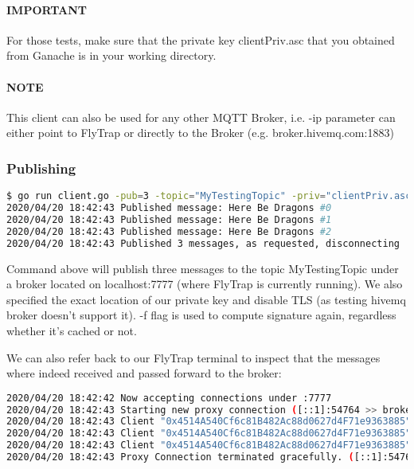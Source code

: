 \paragraph{IMPORTANT} For those tests, make sure that the private key clientPriv.asc that you obtained from Ganache is in your working directory.
\paragraph{NOTE} This client can also be used for any other MQTT Broker, i.e. -ip parameter can either point to FlyTrap or directly to the Broker (e.g. broker.hivemq.com:1883)
\subsubsection{Publishing}
\begin{lstlisting}[language=bash,breaklines=true]
$ go run client.go -pub=3 -topic="MyTestingTopic" -priv="clientPriv.asc" -ip="localhost:7777" -tls=false -f
2020/04/20 18:42:43 Published message: Here Be Dragons #0
2020/04/20 18:42:43 Published message: Here Be Dragons #1
2020/04/20 18:42:43 Published message: Here Be Dragons #2
2020/04/20 18:42:43 Published 3 messages, as requested, disconnecting
\end{lstlisting}
Command above will publish three messages to the topic MyTestingTopic under a broker located on localhost:7777 (where FlyTrap is currently running). We also specified the exact location of our private key and disable TLS (as testing hivemq broker doesn't support it). -f flag is used to compute signature again, regardless whether it's cached or not.

We can also refer back to our FlyTrap terminal to inspect that the messages where indeed received and passed forward to the broker:
\begin{lstlisting}[language=bash,breaklines=true]
2020/04/20 18:42:42 Now accepting connections under :7777
2020/04/20 18:42:43 Starting new proxy connection ([::1]:54764 >> broker.hivemq.com:1883)
2020/04/20 18:42:43 Client "0x4514A540Cf6c81B482Ac88d0627d4F71e9363885" was authorised to publish to topic "MyTestingTopic"
2020/04/20 18:42:43 Client "0x4514A540Cf6c81B482Ac88d0627d4F71e9363885" was already authorised to publish to topic "MyTestingTopic"
2020/04/20 18:42:43 Client "0x4514A540Cf6c81B482Ac88d0627d4F71e9363885" was already authorised to publish to topic "MyTestingTopic"
2020/04/20 18:42:43 Proxy Connection terminated gracefully. ([::1]:54764 >> broker.hivemq.com:1883)
\end{lstlisting}

